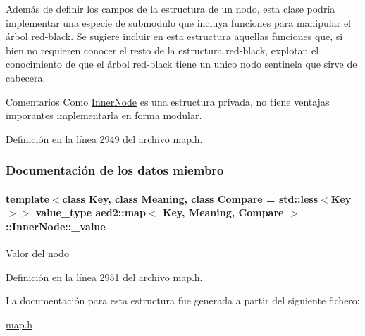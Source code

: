 Además de definir los campos de la estructura de un nodo, esta clase podría implementar una especie de submodulo que incluya funciones para manipular el árbol red-\/black. Se sugiere incluir en esta estructura aquellas funciones que, si bien no requieren conocer el resto de la estructura red-\/black, explotan el conocimiento de que el árbol red-\/black tiene un unico nodo sentinela que sirve de cabecera.

\begin{DoxyRemark}{Comentarios}
Como \hyperlink{structaed2_1_1map_1_1InnerNode}{Inner\+Node} es una estructura privada, no tiene ventajas imporantes implementarla en forma modular. 
\end{DoxyRemark}


Definición en la línea \hyperlink{map_8h_source_l02949}{2949} del archivo \hyperlink{map_8h_source}{map.\+h}.



\subsubsection{Documentación de los datos miembro}
\paragraph[{\texorpdfstring{\+\_\+value}{_value}}]{\setlength{\rightskip}{0pt plus 5cm}template$<$class Key, class Meaning, class Compare = std\+::less$<$\+Key$>$$>$ {\bf value\+\_\+type} {\bf aed2\+::map}$<$ Key, Meaning, Compare $>$\+::Inner\+Node\+::\+\_\+value}\hypertarget{structaed2_1_1map_1_1InnerNode_a53fd8a50986fec67601dd77c44c1657e_a53fd8a50986fec67601dd77c44c1657e}{}\label{structaed2_1_1map_1_1InnerNode_a53fd8a50986fec67601dd77c44c1657e_a53fd8a50986fec67601dd77c44c1657e}
Valor del nodo 

Definición en la línea \hyperlink{map_8h_source_l02951}{2951} del archivo \hyperlink{map_8h_source}{map.\+h}.



La documentación para esta estructura fue generada a partir del siguiente fichero\+:\begin{DoxyCompactItemize}
\item 
\hyperlink{map_8h}{map.\+h}\end{DoxyCompactItemize}
